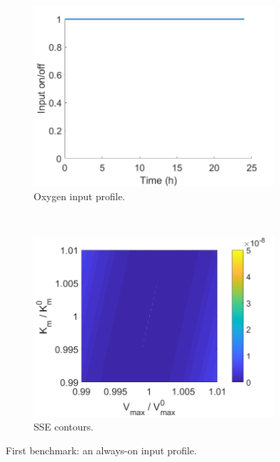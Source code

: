\begin{figure}[H]
	\centering
	\begin{subfigure}[b]{0.45\textwidth}
		\includegraphics[width=\textwidth]{figure/paper 1/compare2input.png}
		\caption{Oxygen input profile.}
		\label{inputcompare2}
	\end{subfigure}
	~ %
	\begin{subfigure}[b]{0.45\textwidth}
		\includegraphics[width=\textwidth]{figure/paper 1/compare2.png}
		\caption{SSE contours.}
		\label{SSEcompare2}
	\end{subfigure}
	\caption{First benchmark: an always-on input profile.}
	\label{compare2}
\end{figure}
